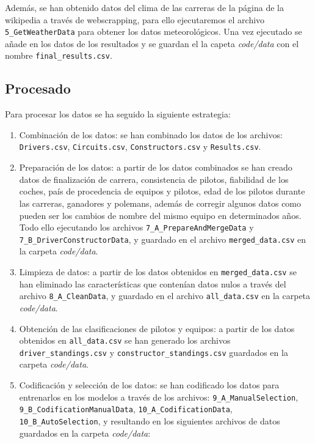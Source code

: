 Además, se han obtenido datos del clima de las carreras de la página de la wikipedia a través de webscrapping, para ello ejecutaremos el archivo \texttt{5\_GetWeatherData} para obtener los datos meteorológicos. Una vez ejecutado se añade en los datos de los resultados y se guardan el la capeta \textit{code/data} con el nombre \texttt{final\_results.csv}.

\subsection{Procesado}

Para procesar los datos se ha seguido la siguiente estrategia:

\begin{enumerate}
    \item Combinación de los datos: se han combinado los datos de los archivos: \texttt{Drivers.csv}, \texttt{Circuits.csv}, \texttt{Constructors.csv} y \texttt{Results.csv}. 
    \item Preparación de los datos: a partir de los datos combinados se han creado datos de finalización de carrera, consistencia de pilotos, fiabilidad de los coches, país de procedencia de equipos y pilotos, edad de los pilotos durante las carreras, ganadores y polemans, además de corregir algunos datos como pueden ser los cambios de nombre del mismo equipo en determinados años. Todo ello ejecutando los archivos \texttt{7\_A\_PrepareAndMergeData} y \texttt{7\_B\_DriverConstructorData}, y guardado en el archivo \texttt{merged\_data.csv} en la carpeta \textit{code/data}.
    \item Limpieza de datos: a partir de los datos obtenidos en \texttt{merged\_data.csv} se han eliminado las características que contenían datos nulos a través del archivo \texttt{8\_A\_CleanData}, y guardado en el archivo \texttt{all\_data.csv} en la carpeta \textit{code/data}.
    \item Obtención de las clasificaciones de pilotos y equipos: a partir de los datos obtenidos en \texttt{all\_data.csv} se han generado los archivos \texttt{driver\_standings.csv} y \texttt{constructor\_standings.csv} guardados en la carpeta \textit{code/data}.
    \item Codificación y selección de los datos: se han codificado los datos para entrenarlos en los modelos a través de los archivos: \texttt{9\_A\_ManualSelection}, \texttt{9\_B\_CodificationManualData}, \texttt{10\_A\_CodificationData}, \texttt{10\_B\_AutoSelection}, y resultando en los siguientes archivos de datos guardados en la carpeta \textit{code/data}:

\end{enumerate}
